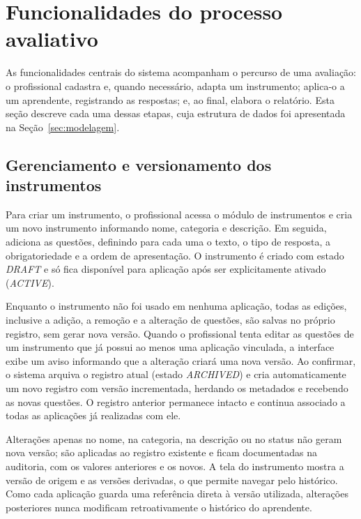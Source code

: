 \section{Funcionalidades do processo avaliativo}\label{sec:funcionalidades}

As funcionalidades centrais do sistema acompanham o percurso de uma avaliação: o profissional cadastra e, quando necessário, adapta um instrumento; aplica-o a um aprendente, registrando as respostas; e, ao final, elabora o relatório. Esta seção descreve cada uma dessas etapas, cuja estrutura de dados foi apresentada na Seção~\ref{sec:modelagem}.

\subsection{Gerenciamento e versionamento dos instrumentos}\label{sec:instrumentos}

Para criar um instrumento, o profissional acessa o módulo de instrumentos e cria um novo instrumento informando nome, categoria e descrição. Em seguida, adiciona as questões, definindo para cada uma o texto, o tipo de resposta, a obrigatoriedade e a ordem de apresentação. O instrumento é criado com estado \textit{DRAFT} e só fica disponível para aplicação após ser explicitamente ativado (\textit{ACTIVE}).

Enquanto o instrumento não foi usado em nenhuma aplicação, todas as edições, inclusive a adição, a remoção e a alteração de questões, são salvas no próprio registro, sem gerar nova versão. Quando o profissional tenta editar as questões de um instrumento que já possui ao menos uma aplicação vinculada, a interface exibe um aviso informando que a alteração criará uma nova versão. Ao confirmar, o sistema arquiva o registro atual (estado \textit{ARCHIVED}) e cria automaticamente um novo registro com versão incrementada, herdando os metadados e recebendo as novas questões. O registro anterior permanece intacto e continua associado a todas as aplicações já realizadas com ele.

Alterações apenas no nome, na categoria, na descrição ou no status não geram nova versão; são aplicadas ao registro existente e ficam documentadas na auditoria, com os valores anteriores e os novos. A tela do instrumento mostra a versão de origem e as versões derivadas, o que permite navegar pelo histórico. Como cada aplicação guarda uma referência direta à versão utilizada, alterações posteriores nunca modificam retroativamente o histórico do aprendente.

